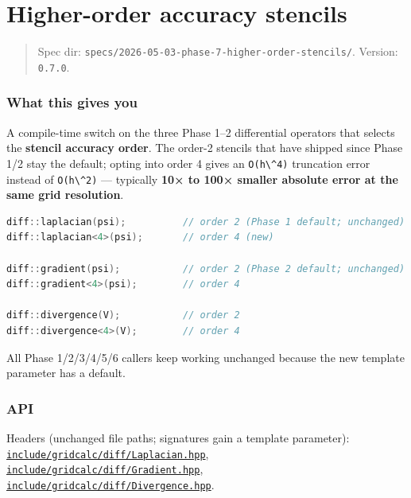 \chapter{Higher-order accuracy stencils}
\label{chap:higher-order-accuracy-stencils}

\begin{quote}
Spec dir:
\passthrough{\lstinline!specs/2026-05-03-phase-7-higher-order-stencils/!}.
Version: \passthrough{\lstinline!0.7.0!}.
\end{quote}

\subsection{What this gives you}\label{what-this-gives-you}

A compile-time switch on the three Phase 1--2 differential operators
that selects the \textbf{stencil accuracy order}. The order-2 stencils
that have shipped since Phase 1/2 stay the default; opting into order 4
gives an \passthrough{\lstinline!O(h\^4)!} truncation error instead of
\passthrough{\lstinline!O(h\^2)!} --- typically \textbf{10× to 100×
smaller absolute error at the same grid resolution}.

\begin{lstlisting}[language={C++}]
diff::laplacian(psi);          // order 2 (Phase 1 default; unchanged)
diff::laplacian<4>(psi);       // order 4 (new)

diff::gradient(psi);           // order 2 (Phase 2 default; unchanged)
diff::gradient<4>(psi);        // order 4

diff::divergence(V);           // order 2
diff::divergence<4>(V);        // order 4
\end{lstlisting}

All Phase 1/2/3/4/5/6 callers keep working unchanged because the new
template parameter has a default.

\subsection{API}\label{api}

Headers (unchanged file paths; signatures gain a template parameter):
\href{../../../include/gridcalc/diff/Laplacian.hpp}{\passthrough{\lstinline!include/gridcalc/diff/Laplacian.hpp!}},
\href{../../../include/gridcalc/diff/Gradient.hpp}{\passthrough{\lstinline!include/gridcalc/diff/Gradient.hpp!}},
\href{../../../include/gridcalc/diff/Divergence.hpp}{\passthrough{\lstinline!include/gridcalc/diff/Divergence.hpp!}}.


